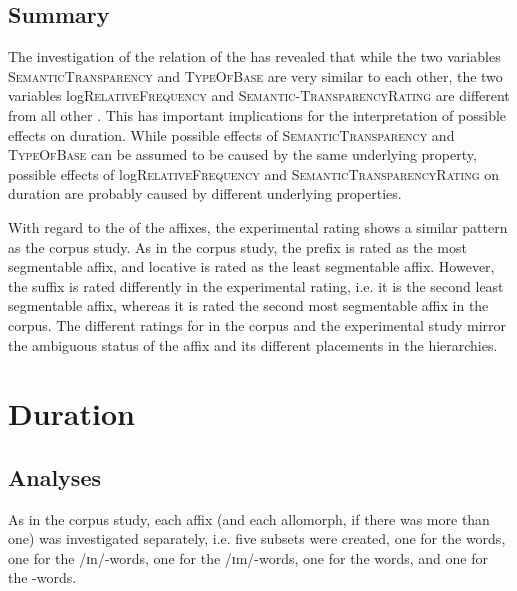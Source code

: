 \subsection{Summary}

The investigation of the relation of the  has revealed that while the two variables \textsc{SemanticTransparency} and \textsc{TypeOfBase} are very similar to each other, the two variables log\textsc{RelativeFrequency} and \textsc{Semantic-TransparencyRating} are different from all other .
This has important implications for the interpretation of possible  effects on duration. While possible effects of \textsc{SemanticTransparency} and \textsc{TypeOfBase} can be assumed to be caused by the same underlying property, possible effects of log\textsc{RelativeFrequency} and \textsc{SemanticTransparencyRating} on duration are probably caused by different underlying properties.



With regard to the  of the affixes, the experimental rating shows a similar pattern as the corpus study. As in the corpus study, the prefix  is rated as the most segmentable affix, and locative  is rated as the least segmentable affix. However, the suffix  is rated differently in the experimental rating, i.e. it is the second least segmentable affix, whereas it is rated the second most segmentable affix in the corpus. The different ratings for  in the corpus and the experimental study mirror the ambiguous  status of the affix and its different placements in the  hierarchies. 



\section{Duration}


\subsection{Analyses} \label{analsyses duration experiment}

As in the corpus study, each affix (and each allomorph, if there was more than one) was investigated separately, i.e. five subsets were created, one for the  words, one for the /ɪn/-words, one for the /ɪm/-words, one for the words, and one for the -words.


